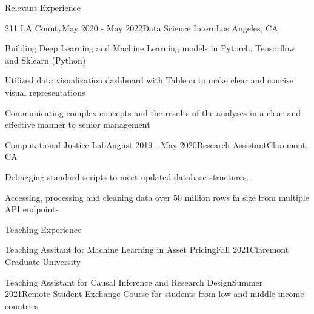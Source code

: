 \documentclass{resume} %
\begin{document}
\begin{rSection}{Relevant Experience}
\begin{rSubsection}{211 LA County}{May 2020 - May 2022}{Data Science Intern}{Los Angeles, CA}
\item Building Deep Learning and Machine Learning models in Pytorch,
Tensorflow and Sklearn (Python)
\item Utilized data visualization dashboard with Tableau to make clear and concise visual representations

\item Communicating complex concepts and the results of the analyses in a clear and effective manner to senior management
\end{rSubsection}
\begin{rSubsection}{Computational Justice Lab}{August 2019 - May 2020}{Research Assistant}{Claremont, CA}
\item Debugging standard scripts to meet updated database
structures.
\item Accessing, processing and cleaning data over 50 million rows in size from multiple API endpoints
\end{rSubsection}
\end{rSection}

\begin{rSection}{Teaching Experience}
\begin{rSubsection}{Teaching Assitant for Machine Learning in Asset Pricing}{Fall 2021}{Claremont Graduate University}{}



\vspace{-0.7cm}
\item[]
\end{rSubsection}

\begin{rSubsection}{Teaching Assistant for Causal Inference and Research Design}{Summer 2021}{Remote Student Exchange Course for students from low and middle-income countries}{}



\vspace{-0.7cm}
\item[]
\end{rSubsection}
\end{rSection}
\end{document}
